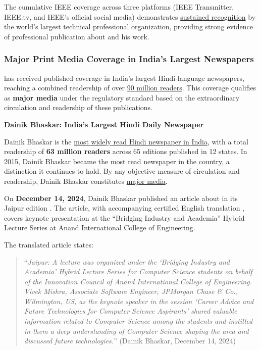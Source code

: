 The cumulative IEEE coverage across three platforms (IEEE Transmitter, IEEE.tv, and IEEE's official social media) demonstrates \underline{sustained recognition} by the world's largest technical professional organization, providing strong evidence of professional publication about \dr and his work.


\subsubsection{Major Print Media Coverage in India's Largest Newspapers}
\label{media:india}

\dr has received published coverage in India's largest Hindi-language newspapers, reaching a combined readership of over \underline{90 million readers}. This coverage qualifies as \textbf{major media} under the regulatory standard based on the extraordinary circulation and readership of these publications.

\textbf{Dainik Bhaskar: India's Largest Hindi Daily Newspaper}

Dainik Bhaskar is the \underline{most widely read Hindi newspaper in India}, with a total readership of \textbf{63 million readers} across 65 editions published in 12 states. In 2015, Dainik Bhaskar became the most read newspaper in the country, a distinction it continues to hold. By any objective measure of circulation and readership, Dainik Bhaskar constitutes \underline{major media}.

On \textbf{December 14, 2024}, Dainik Bhaskar published an article about \dr in its Jaipur edition \cite{PM5}. The article, with accompanying certified English translation \cite{PM6}, covers \drs keynote presentation at the ``Bridging Industry and Academia'' Hybrid Lecture Series at Anand International College of Engineering.

The translated article states:

\begin{quote}
``\textit{Jaipur: A lecture was organized under the `Bridging Industry and Academia' Hybrid Lecture Series for Computer Science students on behalf of the Innovation Council of Anand International College of Engineering. Vivek Mishra, Associate Software Engineer, JPMorgan Chase \& Co., Wilmington, US, as the keynote speaker in the session `Career Advice and Future Technologies for Computer Science Aspirants' shared valuable information related to Computer Science among the students and instilled in them a deep understanding of Computer Science shaping the area and discussed future technologies.}'' (Dainik Bhaskar, December 14, 2024)
\end{quote}

